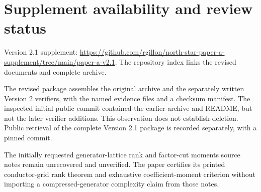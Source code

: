 \documentclass[11pt]{article}
\newcommand{\ReleaseStatus}{Version 2.1 supplement:
\url{https://github.com/rgillon/north-star-paper-a-supplement/tree/main/paper-a-v2.1}.
The repository index links the revised documents and complete archive.}
\begin{document}
\section{Supplement availability and review status}
\ReleaseStatus

The revised package assembles the original archive and the separately
written Version 2 verifiers, with the named evidence files and a checksum
manifest. The inspected initial public commit contained the earlier
archive and README, but not the later verifier additions. This observation
does not establish deletion. Public retrieval of the complete Version 2.1
package is recorded separately, with a pinned commit.

The initially requested generator-lattice rank and factor-cut moments
source notes remain unrecovered and unverified. The paper certifies its
printed conductor-grid rank theorem and exhaustive coefficient-moment
criterion without importing a compressed-generator complexity claim from
those notes.
\end{document}
